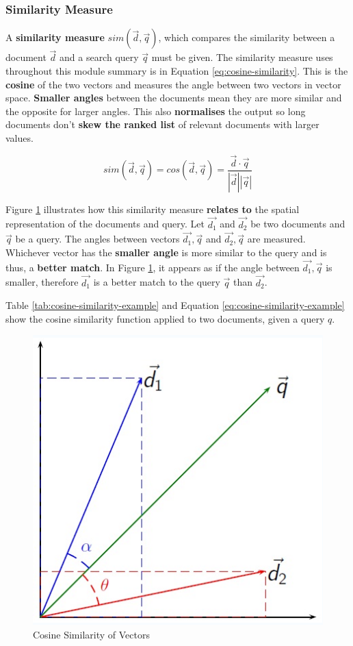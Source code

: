 \documentclass{article}
\begin{document}
\subsubsection{Similarity Measure}

A \textbf{similarity measure} $sim(\vec{d}, \vec{q})$, which compares the similarity between a document $\vec{d}$ and a search query $\vec{q}$ must be given. The similarity measure uses throughout this module summary is in Equation \ref{eq:cosine-similarity}. This is the \textbf{cosine} of the two vectors and measures the angle between two vectors in vector space. \textbf{Smaller angles} between the documents mean they are more similar and the opposite for larger angles. This also \textbf{normalises} the output so long documents don't \textbf{skew the ranked list} of relevant documents with larger values.

\begin{equation}
	sim(\vec{d}, \vec{q}) = cos(\vec{d}, \vec{q}) = \frac{\vec{d} \cdot \vec{q}}{|\vec{d}| |\vec{q}|}
	\label{eq:cosine-similarity}
\end{equation}

Figure \ref{fig:cosine-similarity} illustrates how this similarity measure \textbf{relates to} the spatial representation of the documents and query. Let $\vec{d_1}$ and $\vec{d_2}$ be two documents and $\vec{q}$ be a query. The angles between vectors $\vec{d_1},\vec{q}$ and $\vec{d_2},\vec{q}$ are measured. Whichever vector has the \textbf{smaller angle} is more similar to the query and is thus, a \textbf{better match}. In Figure \ref{fig:cosine-similarity}, it appears as if the angle between $\vec{d_1},\vec{q}$ is smaller, therefore $\vec{d_1}$ is a better match to the query $\vec{q}$ than $\vec{d_2}$.

Table \ref{tab:cosine-similarity-example} and Equation \ref{eq:cosine-similarity-example} show the cosine similarity function applied to two documents, given a query $q$.

\begin{figure}
	\centering
	\includegraphics[scale=0.3]{figures/cosine-similarity.png}
	\caption{Cosine Similarity of Vectors}
	\label{fig:cosine-similarity}
\end{figure}
\end{document}
